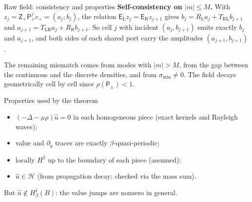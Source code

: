 \documentclass[aspectratio=169]{beamer}
\begin{document}
\begin{frame}{Raw field: consistency and properties}
  \footnotesize
  \textbf{Self-consistency on $|m|\le M$.} With $z_j=\mathsf Z_+\mathsf P_+^jc_+=(a_j;b_j)$,
  the relation $\mathsf E_{\mathrm L}z_j=\mathsf E_{\mathrm R}z_{j+1}$ gives
  $b_j=R_{\mathrm L}a_j+T_{\mathrm{RL}}b_{j+1}$ and
  $a_{j+1}=T_{\mathrm{LR}}a_j+R_{\mathrm R}b_{j+1}$. So cell $j$ with incident
  $(a_j,b_{j+1})$ emits exactly $b_j$ and $a_{j+1}$, and both sides of each shared port
  carry the amplitudes $(a_{j+1},b_{j+1})$.

  The remaining mismatch comes from modes with $|m|>M$, from the gap between the
  continuous and the discrete densities, and from $\sigma_{\min}\neq0$. The field
  decays geometrically cell by cell since $\rho(\mathsf P_\pm)<1$.

  \begin{block}{Properties used by the theorem}
    \begin{itemize}
      \item[(P1)] $(-\Delta-\mu\rho)\widehat u=0$ in each homogeneous piece (exact kernels
        and Rayleigh waves);
      \item[(P2)] value and $\partial_y$ traces are exactly $\beta$-quasi-periodic;
      \item[(P3)] locally $H^2$ up to the boundary of each piece (assumed);
      \item[(P4)] $\widehat u\in\mathcal H$ (from propagation decay; checked via the mass sum).
    \end{itemize}
    But $\widehat u\notin H^1_\beta(B)$: the value jumps are nonzero in general.
  \end{block}
\end{frame}
\end{document}
